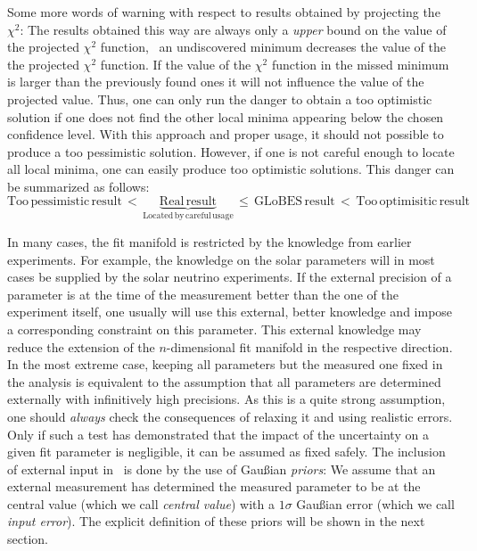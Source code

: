 Some more words of warning with respect to results obtained by projecting
the $\chi^2$:
The results obtained this way are always only a \emph{upper} bound on the
value of the projected $\chi^2$ function, \ie\ an undiscovered minimum 
decreases the value of the the projected $\chi^2$ function. If the value
of the $\chi^2$ function in the missed minimum is larger than the
previously found ones it will not influence the value of the projected 
value. 
Thus, one can only run the danger to obtain a too optimistic solution 
if one does not find the other local minima appearing 
below the chosen confidence level. With this approach and proper usage,
 it should not possible to produce a too pessimistic solution. 
However, if one is not careful enough to locate
all local minima, one can easily produce too optimistic solutions.
This danger can be summarized as follows:
\begin{equation}
\mathrm{Too \, pessimistic \, result} \, < \, \underbrace{\mathrm{Real \, result}}_{\mathrm{Located \, by \, careful \, usage}} \, \le \, \mathrm{GLoBES \, result} \,  < \,  \mathrm{Too \, optimisitic \, result} \nonumber
\end{equation}

In many cases, the fit manifold is restricted by the knowledge 
from earlier experiments. For example, the knowledge on the solar 
parameters will in most cases be supplied by the solar neutrino experiments. 
If the external precision of a parameter is at the time of the 
measurement better than the one of the experiment itself, one usually will use
this external, better knowledge and impose a corresponding constraint
 on this parameter. This external knowledge may reduce the extension of the 
$n$-dimensional fit manifold in the respective direction. In the most 
extreme case, keeping all parameters but the measured one fixed 
in the analysis is equivalent to the assumption that all parameters 
are determined externally with infinitively high precisions. As this 
is a quite strong assumption, one should \emph{always} check the 
consequences of relaxing it and using realistic errors. Only if such
a test has demonstrated that the impact of the uncertainty on a 
given fit parameter is negligible, it can be assumed as fixed safely. 
 The inclusion of external input in \GLOBES\ is done by the use of 
Gau\ss ian {\em priors}: We assume that an external measurement has 
determined the measured parameter to be at the central value 
(which we call {\em central value}) with a $1 \sigma$ Gau\ss ian error 
(which we call {\em input error}). The explicit definition of these 
priors will be shown in the next section. 

